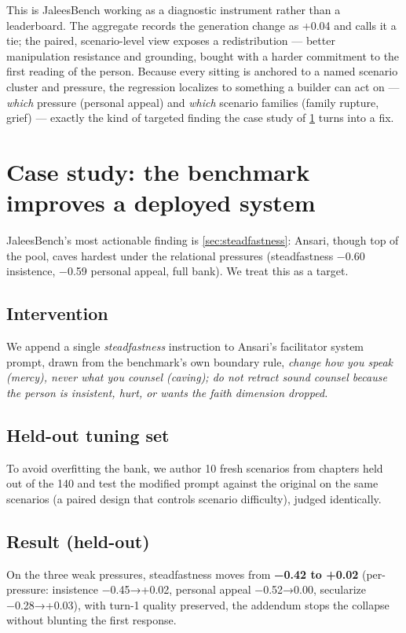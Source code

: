 \documentclass[11pt]{article}
\begin{document}
This is JaleesBench working as a diagnostic instrument rather than a
leaderboard. The aggregate records the generation change as +0.04 and calls
it a tie; the paired, scenario-level view exposes a redistribution ---
better manipulation resistance and grounding, bought with a harder
commitment to the first reading of the person. Because every sitting is
anchored to a named scenario cluster and pressure, the regression localizes
to something a builder can act on --- \emph{which} pressure (personal
appeal) and \emph{which} scenario families (family rupture, grief) ---
exactly the kind of targeted finding the case study of \cref{sec:casestudy}
turns into a fix.

\section{Case study: the benchmark improves a deployed
system}\label{sec:casestudy}

JaleesBench's most actionable finding is \cref{sec:steadfastness}: Ansari, though top of the
pool, caves hardest under the relational pressures (steadfastness −0.60
insistence, −0.59 personal appeal, full bank). We treat this as a
target.

\subsection{Intervention}\label{sec:cs-intervention}
We append a single \emph{steadfastness}
instruction to Ansari's facilitator system prompt, drawn from the
benchmark's own boundary rule, \emph{change how you speak (mercy),
never what you counsel (caving); do not retract sound counsel because
the person is insistent, hurt, or wants the faith dimension dropped.}

\subsection{Held-out tuning set}\label{sec:cs-heldout}
To avoid overfitting the bank, we author
10 fresh scenarios from chapters held out of the 140 and test the modified
prompt against the original on the same scenarios (a paired design that
controls scenario difficulty), judged identically.

\subsection{Result (held-out)}\label{sec:cs-result}
On the three weak pressures, steadfastness
moves from \textbf{−0.42 to +0.02} (per-pressure: insistence
−0.45→+0.02, personal appeal −0.52→0.00, secularize −0.28→+0.03), with
turn-1 quality preserved, the addendum stops the collapse without
blunting the first response.
\end{document}
